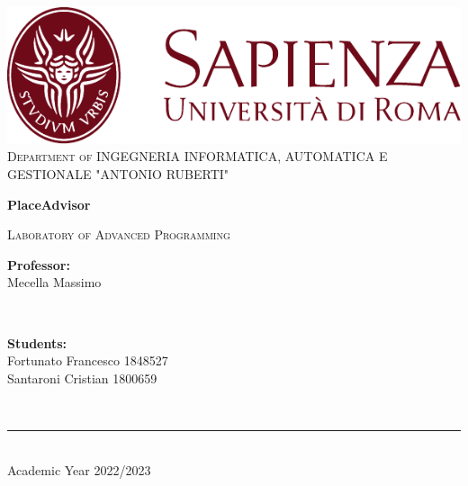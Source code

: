 \begin{titlepage}
	\centering
    \vspace*{0.5 cm}
    \includegraphics[scale = 0.75]{figures/SapienzaLogo.pdf}\\[1.0 cm]	%

    \vspace*{-0.4cm}
    \textsc{\large Department of INGEGNERIA INFORMATICA, AUTOMATICA E GESTIONALE "ANTONIO RUBERTI"}\\[2.0 cm]	%
    \vspace*{1cm}

    { \fontsize{20.74pt}{18.5pt}\selectfont\bfseries PlaceAdvisor \par } %

    \vspace*{0.25cm}
    \textsc{\Large Laboratory of Advanced Programming}\\[0.5 cm] %

    \vspace*{2.6cm}
	\begin{minipage}{0.4\textwidth} %
		\begin{flushleft} \large
			\textbf{Professor:}\\
			Mecella Massimo\\
		\end{flushleft}
	\end{minipage}~
	\begin{minipage}{0.3\textwidth} %
		\begin{flushright} \large
		\begin{minipage}{2\textwidth}
		\begin{flushleft} \large
			\textbf{Students:} \\
			Fortunato Francesco 1848527\\
			Santaroni Cristian 1800659 
        \end{flushleft}
        \end{minipage}
		\end{flushright}
	\end{minipage}\\[3.85 cm]

    \vspace{2cm}
    \rule{\linewidth}{0.2 mm} \\[0.3 cm]
    \vspace*{-0.2cm}
    Academic Year 2022/2023
\end{titlepage}